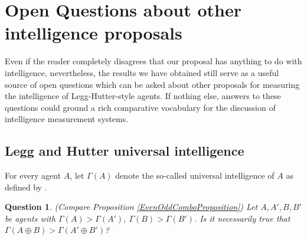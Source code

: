 \documentclass[twoside,11pt]{article}
\newtheorem{question}[theorem]{Question}
\begin{document}

\section{Open Questions about other intelligence proposals}
\label{openquestionsection}

Even if the reader completely disagrees that our proposal has anything to do with
intelligence, nevertheless, the results we have obtained still serve as
a useful source of open questions which can be asked about other proposals for
measuring the intelligence of Legg-Hutter-style agents.
If nothing else, answers to these questions could ground a rich comparative
vocabulary for the discussion of intelligence measurement systems.


\subsection{Legg and Hutter universal intelligence}

For every agent $A$, let $\varGamma(A)$ denote the so-called universal intelligence of $A$
as defined by \citet{hutter2007}.

\begin{question}
\label{FirstOpenQuestion}
    (Compare Proposition \ref{EvenOddComboProposition})
    Let $A,A',B,B'$ be agents with $\varGamma(A)>\varGamma(A')$,
    $\varGamma(B)>\varGamma(B')$.
    Is it necessarily true that $\varGamma(A\oplus B)>\varGamma(A'\oplus B')$?
\end{question}
\end{document}
